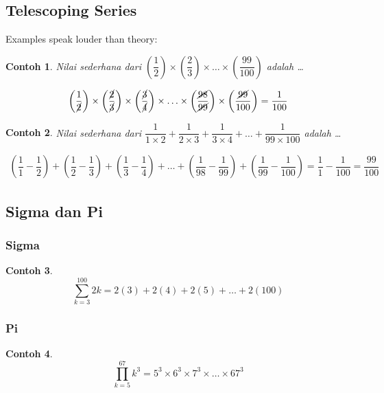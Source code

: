 \documentclass[12pt]{scrartcl}
\newtheorem{contoh}{Contoh}
\newcommand{\bracket}[1]{\left( #1 \right)}
\begin{document}
\subsection{Telescoping Series}
Examples speak louder than theory:
\begin{contoh}
Nilai sederhana dari $\bracket{\dfrac{1}{2}}\times\bracket{\dfrac{2}{3}}\times\ldots\times\bracket{\dfrac{99}{100}}$ adalah \ldots
\end{contoh}
\begin{solusi}
    \begin{align*}
        \bracket{\dfrac{1}{\cancel{2}}}\times\bracket{\dfrac{\cancel{2}}{\cancel{3}}}\times\bracket{\dfrac{\cancel{3}}{\cancel{4}}}\times\ldots\times\bracket{\dfrac{\cancel{98}}{\cancel{99}}}\times\bracket{\dfrac{\cancel{99}}{100}}=\dfrac{1}{100}
    \end{align*}
\end{solusi}
\begin{contoh}
Nilai sederhana dari $\dfrac{1}{1\times 2} + \dfrac{1}{2 \times 3} + \dfrac{1}{3 \times 4} + \dots + \dfrac{1}{99 \times 100}$ adalah \ldots
\end{contoh}
\begin{solusi}
    \begin{align*}
        \bracket{\dfrac{1}{1} - \dfrac{1}{2}} + \bracket{\dfrac{1}{2} - \dfrac{1}{3}} + \bracket{\dfrac{1}{3} - \dfrac{1}{4}} + \ldots + \bracket{\dfrac{1}{98} - \dfrac{1}{99}} + \bracket{\dfrac{1}{99} - \dfrac{1}{100}}=\dfrac{1}{1}-\dfrac{1}{100}=\dfrac{99}{100}
    \end{align*}
\end{solusi}

\subsection{Sigma dan Pi}
\subsubsection{Sigma}
\begin{contoh}
$$\sum_{k=3}^{100} 2k = 2(3)+2(4)+2(5)+\ldots+2(100)$$
\end{contoh}

\subsubsection{Pi}
\begin{contoh}
$$\prod_{k=5}^{67} k^3 = 5^3 \times 6^3 \times 7^3 \times \ldots \times 67^3$$
\end{contoh}
\end{document}
